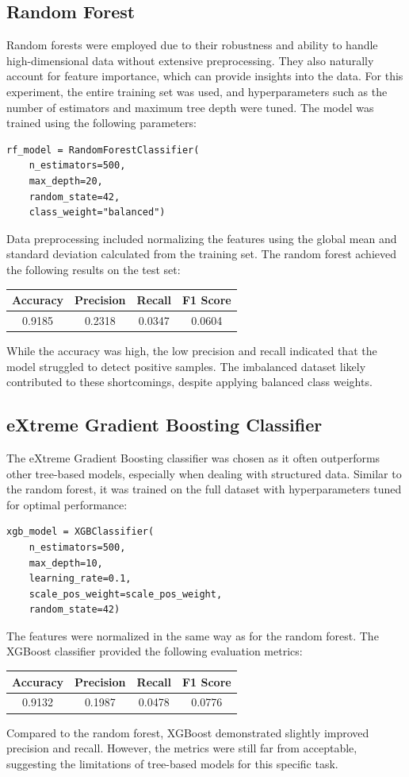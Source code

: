 \documentclass[conference,9pt]{IEEEtran}
\begin{document}
\subsection{Random Forest}
Random forests were employed due to their robustness and ability to handle high-dimensional data without extensive preprocessing. They also naturally account for feature importance, which can provide insights into the data. For this experiment, the entire training set was used, and hyperparameters such as the number of estimators and maximum tree depth were tuned.
The model was trained using the following parameters:
\begin{lstlisting}
rf_model = RandomForestClassifier(
	n_estimators=500,
	max_depth=20,
	random_state=42,
	class_weight="balanced")
\end{lstlisting}
Data preprocessing included normalizing the features using the global mean and standard deviation calculated from the training set. The random forest achieved the following results on the test set:
\begin{center}
    \begin{tabular}{c|c|c|c}
        Accuracy & Precision & Recall & F1 Score \\ 
        \hline 
        0.9185 & 0.2318 &  0.0347 & 0.0604\\
    \end{tabular}
\end{center}
While the accuracy was high, the low precision and recall indicated that the model struggled to detect positive samples. The imbalanced dataset likely contributed to these shortcomings, despite applying balanced class weights.

\subsection{eXtreme Gradient Boosting Classifier}
The eXtreme Gradient Boosting classifier was chosen as it often outperforms other tree-based models, especially when dealing with structured data. Similar to the random forest, it was trained on the full dataset with hyperparameters tuned for optimal performance:
\begin{lstlisting}
xgb_model = XGBClassifier(
    n_estimators=500,
    max_depth=10,
    learning_rate=0.1,
    scale_pos_weight=scale_pos_weight,
    random_state=42)
\end{lstlisting}
The features were normalized in the same way as for the random forest. The XGBoost classifier provided the following evaluation metrics:
\begin{center}
    \begin{tabular}{c|c|c|c}
        Accuracy & Precision & Recall & F1 Score \\ 
        \hline 
        0.9132 & 0.1987 &  0.0478 & 0.0776\\
    \end{tabular}
\end{center}
Compared to the random forest, XGBoost demonstrated slightly improved precision and recall. However, the metrics were still far from acceptable, suggesting the limitations of tree-based models for this specific task.
\end{document}
